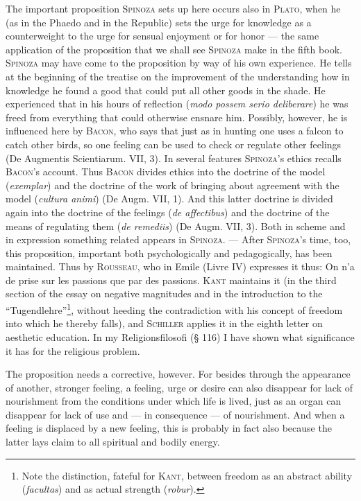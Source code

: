 \documentclass[12pt]{article}
\begin{document}
The important proposition \textsc{Spinoza} sets up here occurs also in \textsc{Plato}, when he
(as in the Phaedo and in the Republic) sets the urge for knowledge as a counterweight to the urge
for sensual enjoyment or for honor --- the same application of the proposition that we shall see
\textsc{Spinoza} make in the fifth book. \textsc{Spinoza} may have come to the proposition by way
of his own experience. He tells at the beginning of the treatise on the improvement of the
understanding how in knowledge he found a good that could put all other goods in the shade. He
experienced that in his hours of reflection (\textit{modo possem serio deliberare}) he was freed
from everything that could otherwise ensnare him. Possibly, however, he is influenced here by
\textsc{Bacon}, who says that just as in hunting one uses a falcon to catch other birds, so one
feeling can be used to check or regulate other feelings (De Augmentis Scientiarum. VII, 3). In
several features \textsc{Spinoza}'s ethics recalls \textsc{Bacon}'s account. Thus \textsc{Bacon}
divides ethics into the doctrine of the model (\textit{exemplar}) and the doctrine of the work of
bringing about agreement with the model (\textit{cultura animi}) (De Augm. VII, 1). And this latter
doctrine is divided again into the doctrine of the feelings (\textit{de affectibus}) and the
doctrine of the means of regulating them (\textit{de remediis}) (De Augm. VII, 3). Both in scheme
and in expression something related appears in \textsc{Spinoza}. --- After \textsc{Spinoza}'s
time, too, this proposition, important both psychologically and pedagogically, has been
maintained. Thus by \textsc{Rousseau}, who in Emile (Livre IV) expresses it thus: On n'a de prise
sur les passions que par des passions. \textsc{Kant} maintains it (in the third section of the
essay on negative magnitudes and in the introduction to the ``Tugendlehre''\footnote{Note the
distinction, fateful for \textsc{Kant}, between freedom as an abstract ability (\textit{facultas})
and as actual strength (\textit{robur}).}, without heeding the contradiction with his concept of
freedom into which he thereby falls), and \textsc{Schiller} applies it in the eighth letter on
aesthetic education. In my Religionsfilosofi (§ 116) I have shown what significance it has for the
religious problem.

The proposition needs a corrective, however. For besides through the appearance of another,
stronger feeling, a feeling, urge or desire can also disappear for lack of nourishment from the
conditions under which life is lived, just as an organ can disappear for lack of use and --- in
consequence --- of nourishment. And when a feeling is displaced by a new feeling, this is probably
in fact also because the latter lays claim to all spiritual and bodily energy.
\end{document}
